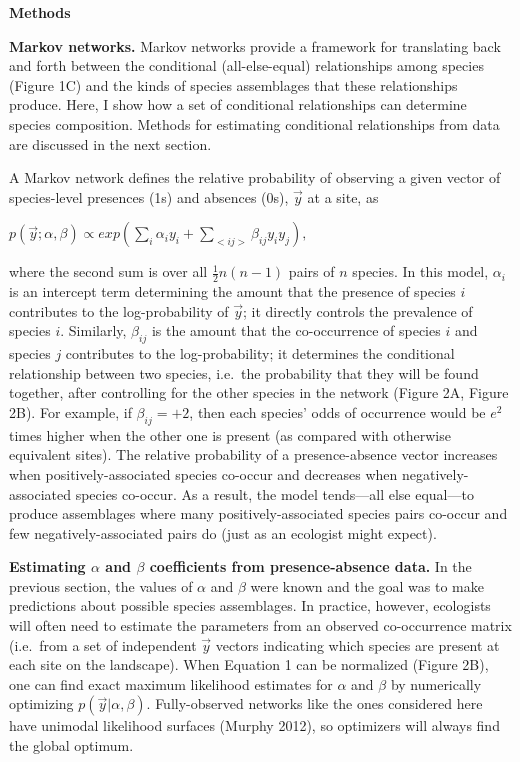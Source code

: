 \documentclass[12pt,]{article}
\begin{document}
\begin{spacing}{1.9}
\begin{flushleft}
\noindent\textbf{Methods}

\noindent
\textbf{Markov networks.} Markov networks provide a framework for
translating back and forth between the conditional (all-else-equal)
relationships among species (Figure 1C) and the kinds of species
assemblages that these relationships produce. Here, I show how a set of
conditional relationships can determine species composition. Methods for
estimating conditional relationships from data are discussed in the next
section.

A Markov network defines the relative probability of observing a given
vector of species-level presences (1s) and absences (0s), \(\vec{y}\) at
a site, as

\centering

\(\displaystyle{p(\vec{y}; \alpha, \beta) \propto exp(\sum_{i}\alpha_i y_i + \sum_{<ij>}\beta_{ij}y_i y_j),}\)

\raggedright
\setlength{\parindent}{2em}

\noindent where the second sum is over all \(\frac{1}{2}n(n-1)\) pairs
of \(n\) species. In this model, \(\alpha_{i}\) is an intercept term
determining the amount that the presence of species \(i\) contributes to
the log-probability of \(\vec{y}\); it directly controls the prevalence
of species \(i\). Similarly, \(\beta_{ij}\) is the amount that the
co-occurrence of species \(i\) and species \(j\) contributes to the
log-probability; it determines the conditional relationship between two
species, i.e.~the probability that they will be found together, after
controlling for the other species in the network (Figure 2A, Figure 2B).
For example, if \(\beta_{ij} = +2\), then each species' odds of
occurrence would be \(e^2\) times higher when the other one is present
(as compared with otherwise equivalent sites). The relative probability
of a presence-absence vector increases when positively-associated
species co-occur and decreases when negatively-associated species
co-occur. As a result, the model tends---all else equal---to produce
assemblages where many positively-associated species pairs co-occur and
few negatively-associated pairs do (just as an ecologist might expect).

\noindent \textbf{Estimating $\alpha$ and $\beta$ coefficients from presence-absence data.}
In the previous section, the values of \(\alpha\) and \(\beta\) were
known and the goal was to make predictions about possible species
assemblages. In practice, however, ecologists will often need to
estimate the parameters from an observed co-occurrence matrix (i.e.~from
a set of independent \(\vec{y}\) vectors indicating which species are
present at each site on the landscape). When Equation 1 can be
normalized (Figure 2B), one can find exact maximum likelihood estimates
for \(\alpha\) and \(\beta\) by numerically optimizing
\(p(\vec{y}|\alpha, \beta)\). Fully-observed networks like the ones
considered here have unimodal likelihood surfaces (Murphy 2012), so
optimizers will always find the global optimum.


\end{flushleft}
\end{spacing}
\end{document}
